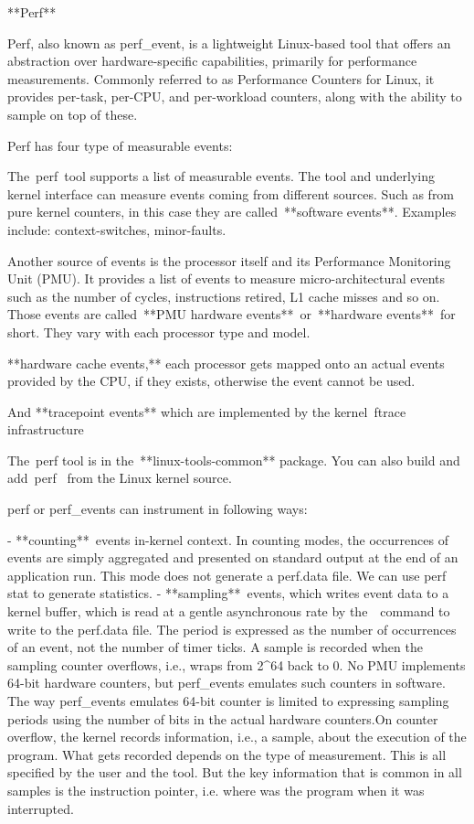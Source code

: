 **Perf**

Perf, also known as perf_event, is a lightweight Linux-based tool that offers an abstraction over hardware-specific capabilities, primarily for performance measurements. Commonly referred to as Performance Counters for Linux, it provides per-task, per-CPU, and per-workload counters, along with the ability to sample on top of these.

Perf has four type of measurable events:

The perf tool supports a list of measurable events. The tool and underlying kernel interface can measure events coming from different sources. Such as from pure kernel counters, in this case they are called **software events**. Examples include: context-switches, minor-faults.

Another source of events is the processor itself and its Performance Monitoring Unit (PMU). It provides a list of events to measure micro-architectural events such as the number of cycles, instructions retired, L1 cache misses and so on. Those events are called **PMU hardware events** or **hardware events** for short. They vary with each processor type and model.

**hardware cache events,** each processor gets mapped onto an actual events provided by the CPU, if they exists, otherwise the event cannot be used.

And **tracepoint events** which are implemented by the kernel ftrace infrastructure

The perf tool is in the **linux-tools-common** package. You can also build and add perf
 from the Linux kernel source.

perf or perf_events can instrument in following ways:

- **counting** events in-kernel context. In counting modes, the occurrences of events are simply aggregated and presented on standard output at the end of an application run. This mode does not generate a perf.data file. We can use perf stat to generate statistics.
- **sampling** events, which writes event data to a kernel buffer, which is read at a gentle asynchronous rate by the  command to write to the perf.data file. The period is expressed as the number of occurrences of an event, not the number of timer ticks. A sample is recorded when the sampling counter overflows, i.e., wraps from 2^64 back to 0. No PMU implements 64-bit hardware counters, but perf_events emulates such counters in software. The way perf_events emulates 64-bit counter is limited to expressing sampling periods using the number of bits in the actual hardware counters.On counter overflow, the kernel records information, i.e., a sample, about the execution of the program. What gets recorded depends on the type of measurement. This is all specified by the user and the tool. But the key information that is common in all samples is the instruction pointer, i.e. where was the program when it was interrupted.
    
